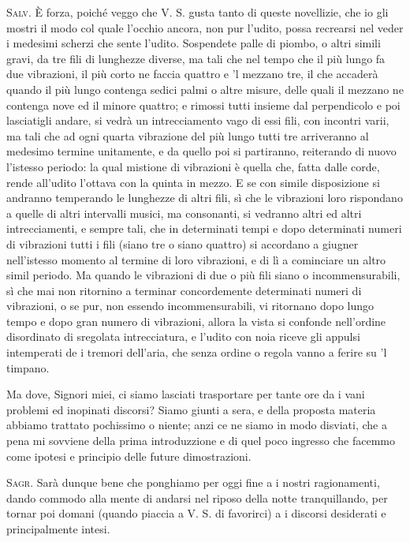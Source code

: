 \documentclass[11pt,twoside,openany]{book}
\newcommand{\speaker}[1]{\textcolor{rubric}{\textsc{#1}}\space}
\begin{document}
\speaker{Salv.} È forza, poiché veggo che V. S. gusta tanto di queste novellizie, che io gli mostri il modo col quale l'occhio ancora, non pur l'udito, possa recrearsi nel veder i medesimi scherzi che sente l'udito. Sospendete palle di piombo, o altri simili gravi, da tre fili di lunghezze diverse, ma tali che nel tempo che il più lungo fa due vibrazioni, il più corto ne faccia quattro e 'l mezzano tre, il che accaderà quando il più lungo contenga sedici palmi o altre misure, delle quali il mezzano ne contenga nove ed il minore quattro; e rimossi tutti insieme dal perpendicolo e poi lasciatigli andare, si vedrà un intrecciamento vago di essi fili, con incontri varii, ma tali che ad ogni quarta vibrazione del più lungo tutti tre arriveranno al medesimo termine unitamente, e da quello poi si partiranno, reiterando di nuovo l'istesso periodo: la qual mistione di vibrazioni è quella che, fatta dalle corde, rende all'udito l'ottava con la quinta in mezzo. E se con simile disposizione si andranno temperando le lunghezze di altri fili, sì che le vibrazioni loro rispondano a quelle di altri intervalli musici, ma consonanti, si vedranno altri ed altri intrecciamenti, e sempre tali, che in determinati tempi e dopo determinati numeri di vibrazioni tutti i fili (siano tre o siano quattro) si accordano a giugner nell'istesso momento al termine di loro vibrazioni, e di lì a cominciare un altro simil periodo. Ma quando le vibrazioni di due o più fili siano o incommensurabili, sì che mai non ritornino a terminar concordemente determinati numeri di vibrazioni, o se pur, non essendo incommensurabili, vi ritornano dopo lungo tempo e dopo gran numero di vibrazioni, allora la vista si confonde nell'ordine disordinato di sregolata intrecciatura, e l'udito con noia riceve gli appulsi intemperati de i tremori dell'aria, che senza ordine o regola vanno a ferire su 'l timpano.

Ma dove, Signori miei, ci siamo lasciati trasportare per tante ore da i vani problemi ed inopinati discorsi? Siamo giunti a sera, e della proposta materia abbiamo trattato pochissimo o niente; anzi ce ne siamo in modo disviati, che a pena mi sovviene della prima introduzzione e di quel poco ingresso che facemmo come ipotesi e principio delle future dimostrazioni.

\speaker{Sagr.} Sarà dunque bene che ponghiamo per oggi fine a i nostri ragionamenti, dando commodo alla mente di andarsi nel riposo della notte tranquillando, per tornar poi domani (quando piaccia a V. S. di favorirci) a i discorsi desiderati e principalmente intesi.
\end{document}
